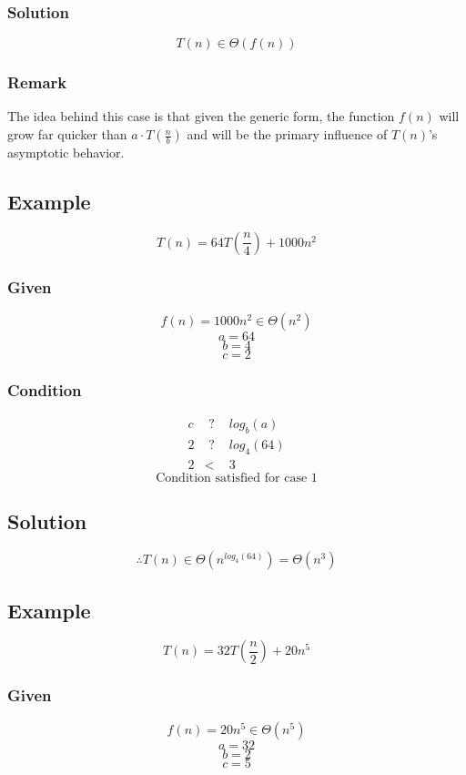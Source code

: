 \subsubsection*{Solution}
$$
T(n) \in \Theta(f(n))
$$

\subsubsection*{Remark}
The idea behind this case is that given the generic form, the function $f(n)$ will grow far quicker than $a \cdot T(\frac{n}{b})$ and will be the primary influence of $T(n)$'s asymptotic behavior.

\pagebreak

\subsection{Example}
$$
T(n) = 64T(\frac{n}{4}) + 1000n^2
$$

\subsubsection*{Given}
$$f(n) = 1000n^2 \in \Theta(n^2)$$
$$a = 64$$
$$b = 4$$
$$c = 2$$

\subsubsection*{Condition}
\begin{eqnarray*}
	c &\text{ ? }& log_b(a)\\
	2 &\text{ ? }& log_4(64)\\
	2 &<& 3
\end{eqnarray*}
$$\text{Condition satisfied for case 1}$$

\subsection*{Solution}
$$
\therefore T(n) \in \Theta(n^{log_4(64)}) = \Theta(n^3)
$$

\subsection{Example}
$$
T(n) = 32T(\frac{n}{2}) + 20n^5
$$

\subsubsection*{Given}
$$f(n) = 20n^5 \in \Theta(n^5)$$
$$a = 32$$
$$b = 2$$
$$c = 5$$

